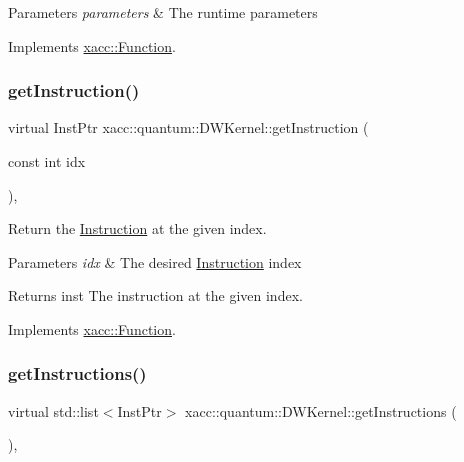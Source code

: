 \begin{DoxyParams}{Parameters}
{\em parameters} & The runtime parameters \\
\hline
\end{DoxyParams}


Implements \hyperlink{a01653_af6ae9453027789a2aaec30e59c9e45e3}{xacc\+::\+Function}.

\mbox{\label{a01221_a00f23cd2e15ea6b9d00d4f3dbe1540f8}} 
\subsubsection{\texorpdfstring{get\+Instruction()}{getInstruction()}}
{\footnotesize\ttfamily virtual Inst\+Ptr xacc\+::quantum\+::\+D\+W\+Kernel\+::get\+Instruction (\begin{DoxyParamCaption}\item[{const int}]{idx }\end{DoxyParamCaption})\hspace{0.3cm}{\ttfamily [inline]}, {\ttfamily [virtual]}}

Return the \hyperlink{a01657}{Instruction} at the given index.


\begin{DoxyParams}{Parameters}
{\em idx} & The desired \hyperlink{a01657}{Instruction} index \\
\hline
\end{DoxyParams}
\begin{DoxyReturn}{Returns}
inst The instruction at the given index. 
\end{DoxyReturn}


Implements \hyperlink{a01653_afa549fc91b5a05f26d8139954a7e0ed5}{xacc\+::\+Function}.

\mbox{\label{a01221_abbb8f2b1c78623c377524e45d581d018}} 
\subsubsection{\texorpdfstring{get\+Instructions()}{getInstructions()}}
{\footnotesize\ttfamily virtual std\+::list$<$Inst\+Ptr$>$ xacc\+::quantum\+::\+D\+W\+Kernel\+::get\+Instructions (\begin{DoxyParamCaption}{ }\end{DoxyParamCaption})\hspace{0.3cm}{\ttfamily [inline]}, {\ttfamily [virtual]}}

